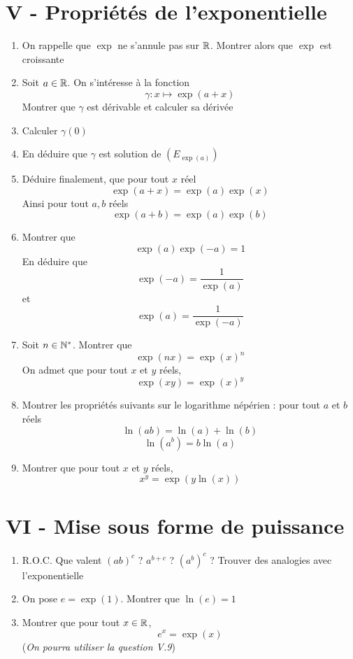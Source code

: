 \section*{V - Propriétés de l'exponentielle}
\begin{enumerate}
\item On rappelle que $\exp$ ne s'annule pas sur $\mathbb{R}$. Montrer alors que $\exp$ est croissante
\item Soit $a\in\mathbb{R}$. On s'intéresse à la fonction $$\gamma : x\mapsto \exp(a+x)$$Montrer que $\gamma$ est dérivable et calculer sa dérivée
\item Calculer $\gamma(0)$
\item En déduire que $\gamma$ est solution de $(E_{\exp(a)})$
\item Déduire finalement, que pour tout $x$ réel
$$\exp(a+x) = \exp(a)\exp(x)$$
Ainsi pour tout $a,b$ réels $$\boxed{\exp(a+b) = \exp(a)\exp(b)}$$
\item Montrer que $$\exp(a)\exp(-a) =1$$ En déduire que $$\boxed{\exp(-a) = \frac{1}{\exp(a)}}$$ et $$\boxed{\exp(a) = \frac{1}{\exp(-a)}}$$
\item Soit $n\in \mathbb{N}^*$. Montrer que $$\boxed{\exp(nx) = \exp(x)^n}$$ On admet que pour tout $x$ et $y$ réels, $$\exp(xy) = \exp(x)^y$$
\item Montrer les propriétés suivants sur le logarithme népérien : pour tout $a$ et $b$ réels 
$$\ln(ab) = \ln(a) + \ln(b)$$
$$\ln(a^b) = b\ln(a)$$ 
\item Montrer que pour tout $x$ et $y$ réels, $$x^y = \exp(y \ln(x))$$
\end{enumerate}
\section*{VI - Mise sous forme de puissance}
\begin{enumerate}
\item R.O.C. Que valent $(ab)^c$ ? $a^{b+c}$ ? $(a^b)^c$ ? Trouver des analogies avec l'exponentielle
\item On pose $e = \exp(1)$. Montrer que $\ln(e) = 1$
\item Montrer que pour tout $x\in \mathbb{R}$, $$\boxed{e^x = \exp(x)}$$ (\emph{On pourra utiliser la question V.9})
\end{enumerate}
